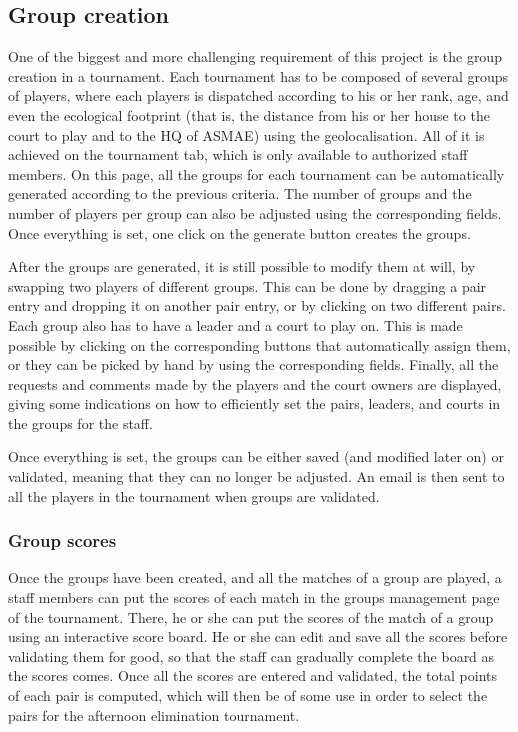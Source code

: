 \subsection{Group creation}
\label{sub:Group creation}


One of the biggest and more challenging requirement of this project is the
group creation in a tournament. Each tournament has to be composed of
several groups of players, where each players is dispatched according to
his or her rank, age, and even the ecological footprint (that is, the distance
from his or her house to the court to play and to the HQ of ASMAE)
using the geolocalisation. All of it is achieved on the tournament tab, which is
only available to authorized staff members. On this page, all the
groups for each tournament can be automatically generated according to the
previous criteria. The number of groups and the number of players per group
can also be adjusted using the corresponding fields. Once everything is set,
one click on the generate button creates the groups. \newline

After the groups are generated, it is still possible to modify them at will, by
swapping two players of different groups. This can be done by dragging a pair
entry and dropping it on another pair entry, or by clicking on two different
pairs. Each group also has to have a leader and a court to play on.
This is made possible by clicking on the corresponding buttons that
automatically assign them, or they can be picked by hand by using the
corresponding fields. Finally, all the requests and comments made by the
players and the court owners are displayed, giving some indications on how
to efficiently set the pairs, leaders, and courts in the groups for the staff.
\newline

Once everything is set, the groups can be either saved (and modified later on)
or validated, meaning that they can no longer be adjusted. An email is then
sent to all the players in the tournament when groups are validated.

\subsubsection{Group scores}
\label{subs:Group scores}


Once the groups have been created, and all the matches of a group are played,
a staff members can put the scores of each match in the groups
management page of the tournament. There, he or she can put the scores of the
match of a group using an interactive score board. He or she can edit and save
all the scores before validating them for good, so that the staff can gradually
complete the board as the scores comes. Once all the scores are entered and
validated, the total points of each pair is computed, which will then be of
some use in order to select the pairs for the afternoon elimination tournament.
\newline

